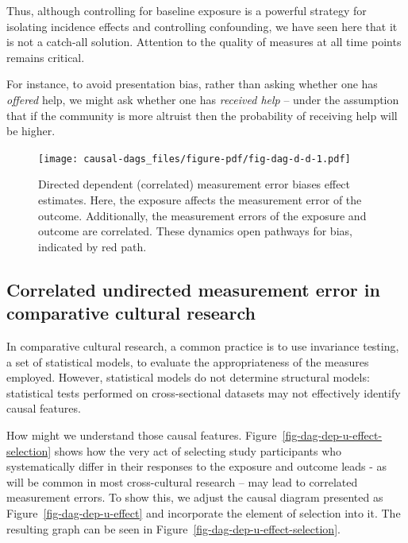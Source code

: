 \documentclass[
  singlecolumn]{report}
\begin{document}
Thus, although controlling for baseline exposure is a powerful strategy
for isolating incidence effects and controlling confounding, we have
seen here that it is not a catch-all solution. Attention to the quality
of measures at all time points remains critical.

For instance, to avoid presentation bias, rather than asking whether one
has \emph{offered} help, we might ask whether one has \emph{received
help} -- under the assumption that if the community is more altruist
then the probability of receiving help will be higher.

\begin{figure}

{\centering \texttt{[image: causal-dags\_files/figure-pdf/fig-dag-d-d-1.pdf]}

}

\caption{\label{fig-dag-d-d}Directed dependent (correlated) measurement
error biases effect estimates. Here, the exposure affects the
measurement error of the outcome. Additionally, the measurement errors
of the exposure and outcome are correlated. These dynamics open pathways
for bias, indicated by red path.}

\end{figure}

\hypertarget{correlated-undirected-measurement-error-in-comparative-cultural-research}{%
\subsection{Correlated undirected measurement error in comparative
cultural
research}\label{correlated-undirected-measurement-error-in-comparative-cultural-research}}

In comparative cultural research, a common practice is to use invariance
testing, a set of statistical models, to evaluate the appropriateness of
the measures employed. However, statistical models do not determine
structural models: statistical tests performed on cross-sectional
datasets may not effectively identify causal features.

How might we understand those causal features.
Figure~\ref{fig-dag-dep-u-effect-selection} shows how the very act of
selecting study participants who systematically differ in their
responses to the exposure and outcome leads - as will be common in most
cross-cultural research -- may lead to correlated measurement errors. To
show this, we adjust the causal diagram presented as
Figure~\ref{fig-dag-dep-u-effect} and incorporate the element of
selection into it. The resulting graph can be seen in
Figure~\ref{fig-dag-dep-u-effect-selection}.
\end{document}
